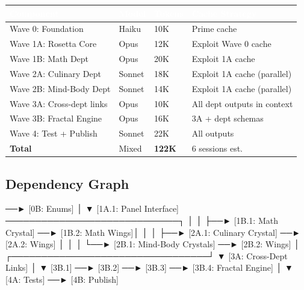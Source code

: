 \documentclass[11pt,letterpaper]{article}
\newcommand{\tableheader}[1]{\textbf{\sffamily\textcolor{white}{#1}}}
\begin{document}
\begin{center}
\begin{tabularx}{\textwidth}{L{5cm}C{2.5cm}C{2cm}C{3cm}}
\toprule
{}
\tableheader{Component} & \tableheader{Model} & \tableheader{Tokens} & \tableheader{Cache Strategy} \\
\midrule
Wave 0: Foundation & Haiku & 10K & Prime cache \\
Wave 1A: Rosetta Core & Opus & 12K & Exploit Wave 0 cache \\
Wave 1B: Math Dept & Opus & 20K & Exploit 1A cache \\
Wave 2A: Culinary Dept & Sonnet & 18K & Exploit 1A cache (parallel) \\
Wave 2B: Mind-Body Dept & Sonnet & 14K & Exploit 1A cache (parallel) \\
Wave 3A: Cross-dept links & Opus & 10K & All dept outputs in context \\
Wave 3B: Fractal Engine & Opus & 16K & 3A + dept schemas \\
Wave 4: Test + Publish & Sonnet & 22K & All outputs \\
\midrule
\textbf{Total} & Mixed & \textbf{122K} & 6 sessions est. \\
\bottomrule
\end{tabularx}
\end{center}

\subsection{Dependency Graph}

\begin{asciibox}
[0A: Schema] ──► [0B: Enums]
      │
      ▼
[1A.1: Panel Interface] ─────────────────────────────┐
      │                                               │
      ├──► [1B.1: Math Crystal] ──► [1B.2: Math Wings]│
      │                                               │
      ├──► [2A.1: Culinary Crystal] ──► [2A.2: Wings] │
      │                                               │
      └──► [2B.1: Mind-Body Crystals] ──► [2B.2: Wings]
                                                      │
                    ┌─────────────────────────────────┘
                    ▼
            [3A: Cross-Dept Links]
                    │
                    ▼
      [3B.1] ──► [3B.2] ──► [3B.3] ──► [3B.4: Fractal Engine]
                                               │
                                               ▼
                              [4A: Tests] ──► [4B: Publish]
\end{asciibox}
\end{document}
